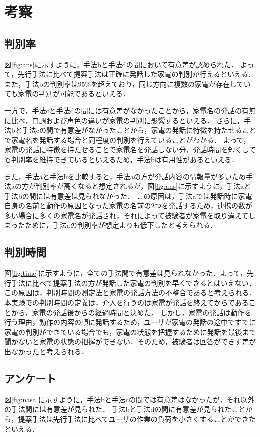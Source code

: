 \documentclass[a4j,12pt,twoside]{jreport}
\begin{document}
\section{考察}
\subsection{判別率}
図\ref{fig:ans}に示すように，手法bと手法dの間において有意差が認められた．
よって，先行手法に比べて提案手法は正確に発話した家電の判別が行えるといえる．
また，手法bの判別率は95\%を超えており，同じ方向に複数の家電が存在していても家電の判別が可能であるといえる．

一方で，手法cと手法dの間には有意差がなかったことから，家電名の発話の有無に比べ，口調および声色の違いが家電の判別に影響するといえる．
さらに，手法bと手法cの間で有意差がなかったことから，家電の発話に特徴を持たせることで家電名を発話する場合と同程度の判別を行えていることがわかる．
よって，家電の発話に特徴を持たせることで家電名を発話しない分，発話時間を短くしても判別率を維持できているといえるため，手法bは有用性があるといえる．

また，手法aと手法bを比較すると，手法aの方が発話内容の情報量が多いため手法aの方が判別率が高くなると想定されるが，図\ref{fig:ans}に示すように，手法aと手法bの間には有意差は見られなかった．
この原因は，手法aでは発話時に家電自身の名前と動作の原因となった家電の名前の2つを発話するため，連携の数が多い場合に多くの家電名が発話され，それによって被験者が家電を取り違えてしまったために，手法aの判別率が想定よりも低下したと考えられる．
\subsection{判別時間}
図\ref{fig:time}に示すように，全ての手法間で有意差は見られなかった．よって，先行手法に比べて提案手法の方が発話した家電の判別を早くできるとはいえない．
この原因は，判別時間の測定法と家電の発話方法の不整合であると考えられる．
本実験での判別時間の定義は，介入を行うのは家電が発話を終えてからであることから，家電の発話後からの経過時間と決めた．
しかし，家電の発話は動作を行う理由，動作の内容の順に発話するため，ユーザが家電の発話の途中ですでに家電の判別ができている場合でも，家電の状態を把握するために発話を最後まで聞かないと家電の状態の把握ができない．そのため，被験者は回答ができず差が出なかったと考えられる．

\subsection{アンケート}
図\ref{fig:nasa}に示すように，手法bと手法cの間では有意差はなかったが，それ以外の手法間には有意差が見られた．
手法bと手法dの間に有意差が見られたことから，提案手法は先行手法に比べてユーザの作業の負荷を小さくすることができたといえる．
\end{document}
